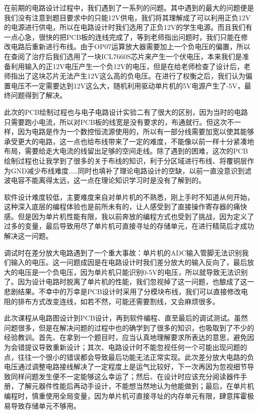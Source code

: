 \documentclass{../source/zjureport}
\begin{document}
        在前期的电路设计过程中，我们遇到了一系列的问题。其中遇到的最大的问题便是我们没有注意到题目要求中的只能12V供电，我们将其理解成了可以利用正负12V的电源进行供电，所以在电路设计时我们选用了正负12V的学生电源。而且我们有一点心急，很快的把PCB板的连线完成了，等到老师指出问题时，我们只能在修改电路后重新进行布线。由于OP07运算放大器需要加上一个负电压的偏置，所以在查阅了治疗后我们选用了一块ICL7660S芯片来产生一个伏电压，本来我们是准备利用输入的正12V电压产生一个负12V的电压，但是在给老师检查了设计后，老师指出了这块芯片无法产生12V这么高的负电压。在进行了权衡之后，我们认为偏置电压不一定需要达到12V这么大，随机利用驱动单片机的5V电源产生了-5V，最终问题得到了解决。


        此次的PCB绘制过程也与电子电路设计实验二有了很大的区别，因为当时的电路只需要跑小电流，所以对PCB板的线宽是没有要求的，布通就行。但这次不一样，因为电路是作为一个数控恒流源使用的，所以有一部分线需要加宽以使其能够承受更大的电路，这一点也给布线带来了一定的难度，不能像以前一样十分紧凑地布局，需要给走大电流的线留出足够的空间走线。除了遇到的困难，这次的PCB绘制过程也让我学到了很多的关于布线的知识，利于分区域进行布线、将覆铜层作为GND减少布线难度……同时也填补了理论电路设计的空缺，以前一直没意识到滤波电容不能离得太远，这一点在理论知识学习时是没有了解到的。


        软件设计难度较低，主要难度来自对单片机的不熟悉，刚上手时不知道从何开始，这种深入底层的编程体验也是前所未有的，让人感受到了直接操作寄存器的痛快感。但是因为单片机性能有限，我以前奔放的编程方式也受到了挑战，因为定义了过多的变量，最后导致用尽了单片机可直接寻址的存储单元，在进行精简后才成功解决这一问题。


        调试时在差分放大电路遇到了一个重大事故：单片机的ADC输入管脚无法识别我们输入的电压。这一问题成因是在电路设计时我们差分放大的输入反向了，最后放大的电压是一个负电压，因为单片机只能识别0-5V的电压，所以就导致无法识别了。因为设计电路时脱离了单片机的性能，我们忽视掉了这一问题，也酿成了这一悲剧结果。不幸中的万幸是PCB设计时采用了分模块布线，我们可以直接修改电阻的排布方式改变连线，如若不然，可能还需要割线，又会麻烦很多。


        此次课程从电路图设计到PCB设计，再到软件编程、直至最后的调试测试。虽然问题很多，但是在解决问题的过程中也的确学到了很多的知识，也吸取到了不少的经验教训。首先、在拿到一个题目时，应当认真地理解要求所表达的意思，避免因为会错提议导致重新设计；其次、电路设计时不能忽视任何一个可能出现问题的点，往往一个很小的错误都会导致最后功能无法正常实现。此次差分放大电路的负电压通过调整电路接线解决了一定程度上是运气比较好，下一次再因为忽视细节导致同样问题发生便不一定能够这么幸运了；然后、在设计时应该充分阅读器件手册，了解元器件性能后再动手设计，不能想当然地认为他能做到；最后，在单片机编程时，慎重使用全局变量，因为单片机可直接寻址的内存单元有限，肆意挥霍极易导致存储单元不够用。
        \newpage
\end{document}
